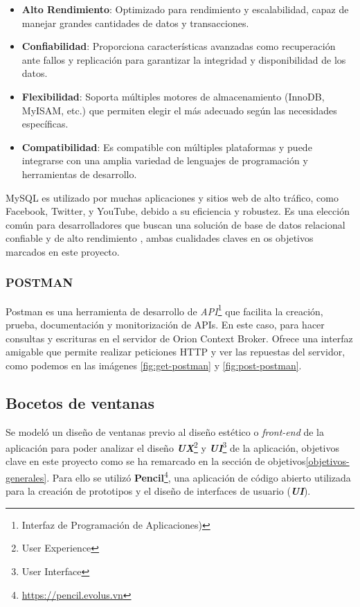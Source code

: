 \begin{itemize}
    \item \textbf{Alto Rendimiento}: Optimizado para rendimiento y escalabilidad, capaz de manejar grandes cantidades de datos y transacciones.
    \item \textbf{Confiabilidad}: Proporciona características avanzadas como recuperación ante fallos y replicación para garantizar la integridad y disponibilidad de los datos.
    \item \textbf{Flexibilidad}: Soporta múltiples motores de almacenamiento (InnoDB, MyISAM, etc.) que permiten elegir el más adecuado según las necesidades específicas.
    \item \textbf{Compatibilidad}: Es compatible con múltiples plataformas y puede integrarse con una amplia variedad de lenguajes de programación y herramientas de desarrollo.
\end{itemize}

MySQL es utilizado por muchas aplicaciones y sitios web de alto tráfico, como Facebook, Twitter, y YouTube, debido a su eficiencia y robustez. Es una elección común para desarrolladores que buscan una solución de base de datos relacional confiable y de alto rendimiento \cite{mysqlcookbook}, ambas cualidades claves en os objetivos marcados en este proyecto.

\subsubsection{POSTMAN}

Postman es una herramienta de desarrollo de \textit{API}\footnote{Interfaz de Programación de Aplicaciones)} que facilita la creación, prueba, documentación y monitorización de APIs. En este caso, para hacer consultas y escrituras en el servidor de Orion Context Broker. Ofrece una interfaz amigable que permite realizar peticiones HTTP y ver las repuestas del servidor, como podemos en las imágenes \ref{fig:get-postman} y \ref{fig:post-postman}.

\subsection{Bocetos de ventanas}

Se modeló un diseño de ventanas previo al diseño estético o \textit{front-end} de la aplicación para poder analizar el diseño \textbf{\textit{UX}}\footnote{User Experience} y \textbf{\textit{UI}}\footnote{User Interface} de la aplicación, objetivos clave en este proyecto como se ha remarcado en la sección de objetivos\ref{objetivos-generales}. Para ello se utilizó \textbf{Pencil}\footnote{\url{https://pencil.evolus.vn}}, una aplicación de código abierto utilizada para la creación de prototipos y el diseño de interfaces de usuario (\textbf{\textit{UI}}).


